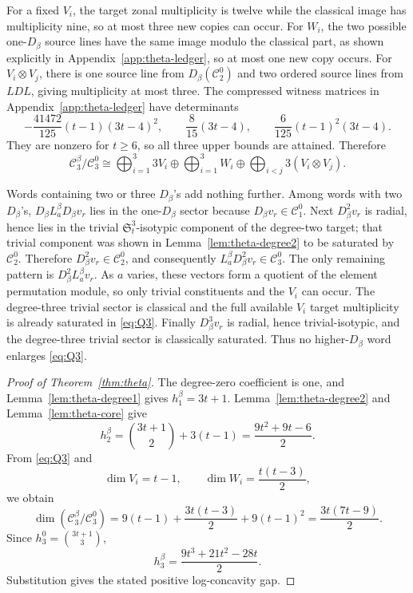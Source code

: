 \documentclass[11pt]{amsart}
\theoremstyle{definition}
\theoremstyle{remark}
\newcommand{\cc}{\mathcal}
\begin{document}
For a fixed $V_i$, the target zonal multiplicity is twelve while the classical image has multiplicity nine, so at most three new copies can occur.  For $W_i$, the two possible one-$D_\beta$ source lines have the same image modulo the classical part, as shown explicitly in Appendix~\ref{app:theta-ledger}, so at most one new copy occurs.  For $V_i\otimes V_j$, there is one source line from $D_\beta(\cc C_2^0)$ and two ordered source lines from $L D L$, giving multiplicity at most three.  The compressed witness matrices in Appendix~\ref{app:theta-ledger} have determinants
\begin{equation}\label{eq:theta-dets}
-\frac{41472}{125}(t-1)(3t-4)^2,
\qquad
\frac8{15}(3t-4),
\qquad
\frac6{125}(t-1)^2(3t-4).
\end{equation}
They are nonzero for $t\ge6$, so all three upper bounds are attained.  Therefore
\begin{equation}\label{eq:Q3}
\cc C_3^\beta/\cc C_3^0
\cong
\bigoplus_{i=1}^3 3V_i
\oplus
\bigoplus_{i=1}^3 W_i
\oplus
\bigoplus_{i<j}3(V_i\otimes V_j).
\end{equation}

Words containing two or three $D_\beta$'s add nothing further.  Among words with two $D_\beta$'s, $D_\beta L_a^\beta D_\beta v_r$ lies in the one-$D_\beta$ sector because $D_\beta v_r\in\cc C_1^0$.  Next $D_\beta^2v_r$ is radial, hence lies in the trivial $\mathfrak S_t^3$-isotypic component of the degree-two target; that trivial component was shown in Lemma~\ref{lem:theta-degree2} to be saturated by $\cc C_2^0$.  Therefore $D_\beta^2v_r\in\cc C_2^0$, and consequently $L_a^\beta D_\beta^2v_r\in\cc C_3^0$.  The only remaining pattern is $D_\beta^2L_a^\beta v_r$.  As $a$ varies, these vectors form a quotient of the element permutation module, so only trivial constituents and the $V_i$ can occur.  The degree-three trivial sector is classical and the full available $V_i$ target multiplicity is already saturated in \eqref{eq:Q3}.  Finally $D_\beta^3v_r$ is radial, hence trivial-isotypic, and the degree-three trivial sector is classically saturated.  Thus no higher-$D_\beta$ word enlarges \eqref{eq:Q3}.

\begin{proof}[Proof of Theorem~\ref{thm:theta}]
The degree-zero coefficient is one, and Lemma~\ref{lem:theta-degree1} gives $h_1^\beta=3t+1$.  Lemma~\ref{lem:theta-degree2} and Lemma~\ref{lem:theta-core} give
\[
h_2^\beta=\binom{3t+1}{2}+3(t-1)=\frac{9t^2+9t-6}{2}.
\]
From \eqref{eq:Q3} and
\[
\dim V_i=t-1,\qquad \dim W_i=\frac{t(t-3)}2,
\]
we obtain
\[
\dim(\cc C_3^\beta/\cc C_3^0)
=9(t-1)+\frac{3t(t-3)}2+9(t-1)^2
=\frac{3t(7t-9)}2.
\]
Since $h_3^0=\binom{3t+1}{3}$,
\[
h_3^\beta=\frac{9t^3+21t^2-28t}{2}.
\]
Substitution gives the stated positive log-concavity gap.
\end{proof}
\end{document}
